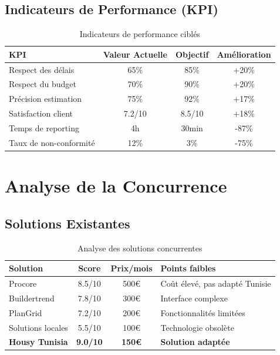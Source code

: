 \documentclass[12pt, a4paper]{report}
\begin{document}
\subsection{Indicateurs de Performance (KPI)}

\begin{table}[h]
\centering
\caption{Indicateurs de performance ciblés}
\begin{tabular}{|l|c|c|c|}
\hline
\textbf{KPI} & \textbf{Valeur Actuelle} & \textbf{Objectif} & \textbf{Amélioration} \\
\hline
Respect des délais & 65\% & 85\% & +20\% \\
\hline
Respect du budget & 70\% & 90\% & +20\% \\
\hline
Précision estimation & 75\% & 92\% & +17\% \\
\hline
Satisfaction client & 7.2/10 & 8.5/10 & +18\% \\
\hline
Temps de reporting & 4h & 30min & -87\% \\
\hline
Taux de non-conformité & 12\% & 3\% & -75\% \\
\hline
\end{tabular}
\end{table}

\section{Analyse de la Concurrence}

\subsection{Solutions Existantes}

\begin{table}[h]
\centering
\caption{Analyse des solutions concurrentes}
\begin{tabular}{|l|c|c|p{4cm}|}
\hline
\textbf{Solution} & \textbf{Score} & \textbf{Prix/mois} & \textbf{Points faibles} \\
\hline
Procore & 8.5/10 & 500€ & Coût élevé, pas adapté Tunisie \\
\hline
Buildertrend & 7.8/10 & 300€ & Interface complexe \\
\hline
PlanGrid & 7.2/10 & 200€ & Fonctionnalités limitées \\
\hline
Solutions locales & 5.5/10 & 100€ & Technologie obsolète \\
\hline
\textbf{Housy Tunisia} & \textbf{9.0/10} & \textbf{150€} & \textbf{Solution adaptée} \\
\hline
\end{tabular}
\end{table}
\end{document}
